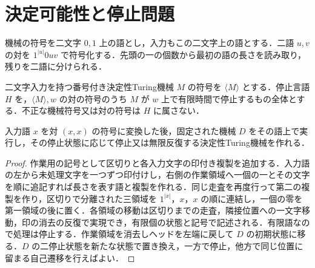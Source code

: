 \section{決定可能性と停止問題}
\begin{defn}[機械と入力の対の符号]
機械の符号を二文字 $0,1$ 上の語とし，入力もこの二文字上の語とする．二語 $u,v$ の対を $1^{|u|}0uv$ で符号化する．先頭の一の個数から最初の語の長さを読み取り，残りを二語に分けられる．
\end{defn}
\begin{defn}[停止問題]
二文字入力を持つ番号付き決定性Turing機械 $M$ の符号を $\langle M\rangle$ とする．停止言語 $H$ を，$\langle M\rangle,w$ の対の符号のうち $M$ が $w$ 上で有限時間で停止するもの全体とする．不正な機械符号又は対の符号は $H$ に属さない．
\end{defn}
\begin{prop}[対符号の自己複製と機械の合成]
入力語 $x$ を対 $(x,x)$ の符号に変換した後，固定された機械 $D$ をその語上で実行し，その停止状態に応じて停止又は無限反復する決定性Turing機械を作れる．
\end{prop}
\begin{proof}
作業用の記号として区切りと各入力文字の印付き複製を追加する．入力語の左から未処理文字を一つずつ印付けし，右側の作業領域へ一個の一とその文字を順に追記すれば長さを表す語と複製を作れる．同じ走査を再度行って第二の複製を作り，区切りで分離された三領域を $1^{|x|}$，$x$，$x$ の順に連結し，一個の零を第一領域の後に置く．各領域の移動は区切りまでの走査，隣接位置への一文字移動，印の消去の反復で実現でき，有限個の状態と記号で記述される．有限語なので処理は停止する．作業領域を消去しヘッドを左端に戻して $D$ の初期状態に移る．$D$ の二停止状態を新たな状態で置き換え，一方で停止，他方で同じ位置に留まる自己遷移を行えばよい．
\end{proof}
